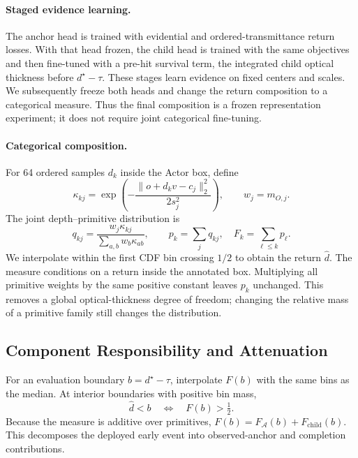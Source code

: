 \paragraph{Staged evidence learning.}
The anchor head is trained with evidential and ordered-transmittance return losses.
With that head frozen, the child head is trained with the same objectives and then fine-tuned with
a pre-hit survival term, the integrated child optical thickness before $d^\star-\tau$.
These stages learn evidence on fixed centers and scales.
We subsequently freeze both heads and change the return composition to a categorical measure.
Thus the final composition is a frozen representation experiment; it does not require joint categorical fine-tuning.

\paragraph{Categorical composition.}
For 64 ordered samples $d_k$ inside the Actor box, define
\begin{equation}
\kappa_{kj}=\exp\!\left(-\frac{\|o+d_kv-c_j\|_2^2}{2s_j^2}\right),
\qquad w_j=m_{O,j}.
\end{equation}
The joint depth--primitive distribution is
\begin{equation}
q_{kj}=\frac{w_j\kappa_{kj}}{\sum_{a,b}w_b\kappa_{ab}},
\qquad p_k=\sum_jq_{kj},\quad F_k=\sum_{\ell\leq k}p_\ell.
\label{eq:categorical-return}
\end{equation}
We interpolate within the first CDF bin crossing $1/2$ to obtain the return $\widehat d$.
The measure conditions on a return inside the annotated box.
Multiplying all primitive weights by the same positive constant leaves $p_k$ unchanged.
This removes a global optical-thickness degree of freedom; changing the relative mass of a primitive
family still changes the distribution.

\subsection{Component Responsibility and Attenuation}
\label{sec:attenuation}

For an evaluation boundary $b=d^\star-\tau$, interpolate $F(b)$ with the same bins as the median.
At interior boundaries with positive bin mass,
\begin{equation}
\widehat d<b\quad\Longleftrightarrow\quad F(b)>\tfrac12.
\label{eq:categorical-safety-boundary}
\end{equation}
Because the measure is additive over primitives,
$F(b)=F_{\mathcal A}(b)+F_{\mathrm{child}}(b)$.
This decomposes the deployed early event into observed-anchor and completion contributions.

